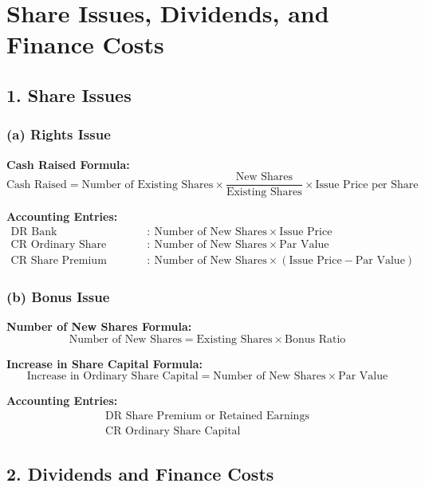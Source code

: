 \section*{Share Issues, Dividends, and Finance Costs}

\subsection*{1. Share Issues}

\subsubsection*{(a) Rights Issue}

\textbf{Cash Raised Formula:}
\[
\text{Cash Raised} = \text{Number of Existing Shares} \times \frac{\text{New Shares}}{\text{Existing Shares}} \times \text{Issue Price per Share}
\]

\textbf{Accounting Entries:}
\[
\begin{aligned}
\text{DR Bank} &: \ \text{Number of New Shares} \times \text{Issue Price} \\
\text{CR Ordinary Share Capital} &: \ \text{Number of New Shares} \times \text{Par Value} \\
\text{CR Share Premium} &: \ \text{Number of New Shares} \times (\text{Issue Price} - \text{Par Value})
\end{aligned}
\]

\subsubsection*{(b) Bonus Issue}

\textbf{Number of New Shares Formula:}
\[
\text{Number of New Shares} = \text{Existing Shares} \times \text{Bonus Ratio}
\]

\textbf{Increase in Share Capital Formula:}
\[
\text{Increase in Ordinary Share Capital} = \text{Number of New Shares} \times \text{Par Value}
\]

\textbf{Accounting Entries:}
\[
\begin{aligned}
\text{DR Share Premium or Retained Earnings} \\
\text{CR Ordinary Share Capital}
\end{aligned}
\]

\subsection*{2. Dividends and Finance Costs}

